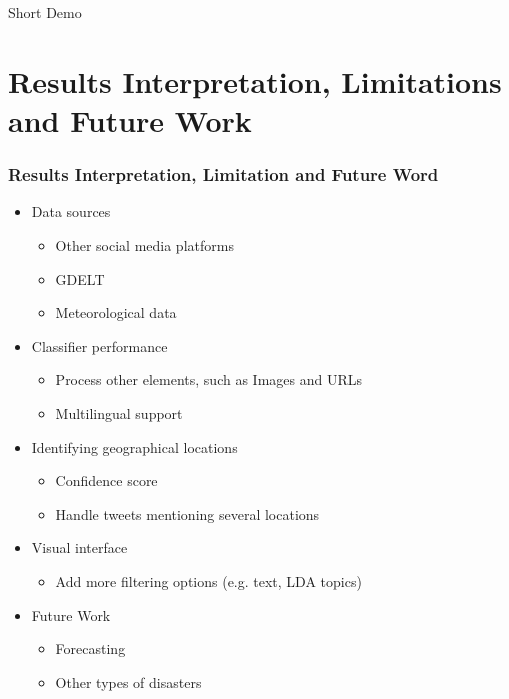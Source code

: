 \documentclass{beamer}
\begin{document}
  \begin{frame}
\begin{center}
\Huge Short Demo
\end{center}
  \end{frame}
\section{Results Interpretation, Limitations and Future Work}

\begin{frame}
  \frametitle{Results Interpretation, Limitation and Future Word}
  \begin{itemize}
    \item Data sources
      \begin{itemize}
      \item Other social media platforms
      \item GDELT
      \item Meteorological data
      \end{itemize}
   \item Classifier performance
     \begin{itemize}
     \item Process other elements, such as Images and URLs
     \item Multilingual support
     \end{itemize}
   \item Identifying geographical locations
      \begin{itemize}
    \item Confidence score
    \item Handle tweets mentioning several locations
      \end{itemize}
   \item Visual interface
      \begin{itemize}
    \item Add more filtering options (e.g. text, LDA topics)
      \end{itemize}
    \item Future Work
    \begin{itemize}
      \item Forecasting 
      \item Other types of disasters
    \end{itemize}
  \end{itemize}
\end{frame}
\end{document}
